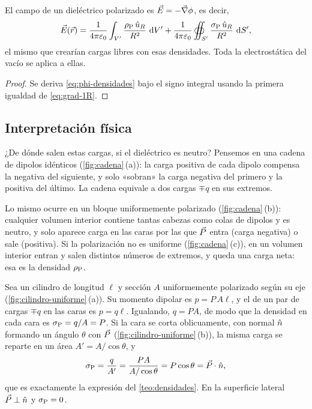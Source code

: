 \begin{corolario}\label{cor:campo-ligadas}
El campo de un dieléctrico polarizado es $\vec E=-\vec\nabla\phi$, es decir,
\begin{equation}\label{eq:E-densidades}
  \vec E(\vec r)=\frac{1}{4\pi\varepsilon_0}\int_{V'}\frac{\rho_{\mathrm P}\,\hat u_{R}}{R^2}\,\mathop{}\!\mathrm{d} V'
           +\frac{1}{4\pi\varepsilon_0}\oiint_{S'}\frac{\sigma_{\mathrm P}\,\hat u_{R}}{R^2}\,\mathop{}\!\mathrm{d} S' ,
\end{equation}
el mismo que crearían cargas libres con esas densidades. Toda la electrostática del vacío se aplica a ellas.
\end{corolario}

\begin{proof}
Se deriva \eqref{eq:phi-densidades} bajo el signo integral usando la primera igualdad de \eqref{eq:grad-1R}.
\end{proof}

\subsection{Interpretación física}\label{sec:interpretacion}

¿De dónde salen estas cargas, si el dieléctrico es neutro? Pensemos en una cadena de dipolos idénticos
(\cref{fig:cadena}\,(a)): la carga positiva de cada dipolo compensa la negativa del siguiente, y solo
«sobran» la carga negativa del primero y la positiva del último. La cadena equivale a dos cargas $\mp q$ en
sus extremos.



Lo mismo ocurre en un bloque uniformemente polarizado (\cref{fig:cadena}\,(b)): cualquier volumen interior
contiene tantas cabezas como colas de dipolos y es neutro, y solo aparece carga en las caras por las que
$\vec P$ entra (carga negativa) o sale (positiva). Si la polarización no es uniforme
(\cref{fig:cadena}\,(c)), en un volumen interior entran y salen distintos números de extremos, y queda una
carga neta: esa es la densidad $\rho_{\mathrm P}$.

\begin{ejemplo}\label{ej:sigmaP-directo}
Sea un cilindro de longitud $\ell$ y sección $A$ uniformemente polarizado según su eje
(\cref{fig:cilindro-uniforme}\,(a)). Su momento dipolar es $p=P\,A\ell$, y el de un par de cargas $\mp q$ en las
caras es $p=q\ell$. Igualando, $q=PA$, de modo que la densidad en cada cara es $\sigma_{\mathrm P}=q/A=P$. Si la cara
se corta oblicuamente, con normal $\hat n$ formando un ángulo $\theta$ con $\vec P$ (\cref{fig:cilindro-uniforme}\,(b)), la
misma carga se reparte en un área $A'=A/\cos\theta$, y
\[
  \sigma_{\mathrm P}=\frac{q}{A'}=\frac{PA}{A/\cos\theta}=P\cos\theta=\vec P\cdot\hat n ,
\]
que es exactamente la expresión del \cref{teo:densidades}. En la superficie lateral $\vec P\perp\hat n$ y $\sigma_{\mathrm P}=0$.
\end{ejemplo}

